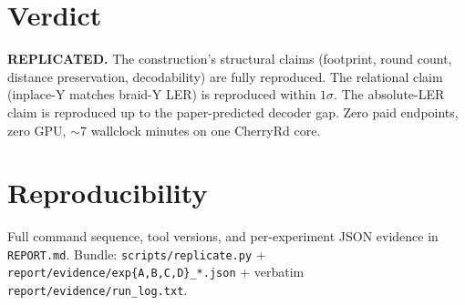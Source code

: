 \documentclass[11pt]{article}
\begin{document}
\section{Verdict}
\label{sec:verdict}

\textbf{REPLICATED.} The construction's structural claims (footprint, round
count, distance preservation, decodability) are fully reproduced. The
relational claim (inplace-Y matches braid-Y LER) is reproduced within $1\sigma$.
The absolute-LER claim is reproduced up to the paper-predicted decoder gap.
Zero paid endpoints, zero GPU, $\sim$7 wallclock minutes on one CherryRd core.

\section{Reproducibility}

Full command sequence, tool versions, and per-experiment JSON evidence in
\texttt{REPORT.md}. Bundle: \texttt{scripts/replicate.py} +
\texttt{report/evidence/exp\{A,B,C,D\}\_*.json} + verbatim
\texttt{report/evidence/run\_log.txt}.


\end{document}
